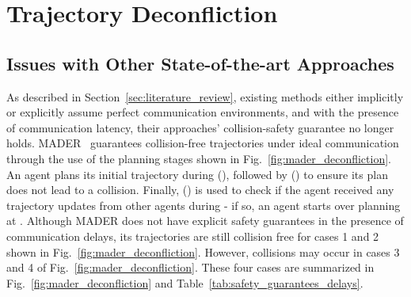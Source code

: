 \chapter{Trajectory Deconfliction}

\section{Issues with Other State-of-the-art Approaches}

As described in Section~\ref{sec:literature_review}, existing methods either implicitly or explicitly assume perfect communication environments, and with the presence of communication latency, their approaches' collision-safety guarantee no longer holds. 
MADER~\cite{tordesillas_mader_2022} guarantees collision-free trajectories under ideal communication through the use of the planning stages shown in Fig.~\ref{fig:mader_deconfliction}.
An agent plans its initial trajectory during \OptimizationStep{} (\OStep{}), followed by \CheckStep{} (\CStep{}) to ensure its plan does not lead to a collision.
Finally, \RecheckStep{} (\RStep{}) is used to check if the agent received any trajectory updates from other agents during \CStep{} - if so, an agent starts over planning at \OStep{}.
Although MADER does not have explicit safety guarantees in the presence of communication delays, its trajectories are still collision free for cases 1 and 2 shown in Fig.~\ref{fig:mader_deconfliction}. However,  collisions may occur in cases 3 and 4 of Fig.~\ref{fig:mader_deconfliction}.
These four cases are summarized in Fig.~\ref{fig:mader_deconfliction} and Table~\ref{tab:safety_guarantees_delays}.

